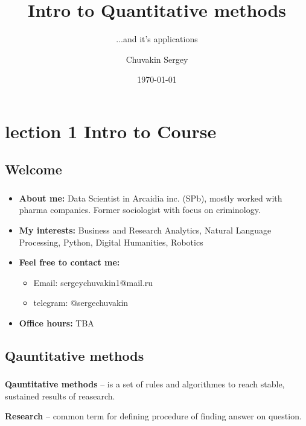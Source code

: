 \documentclass[t, 11pt]{beamer}
\title{Intro to Quantitative methods}
\subtitle{...and it's applications}
\author{Chuvakin Sergey}
\date{\today}
\institute[<<Anthropology>>]{<<School of Advanced Studies>>}
\begin{document}
	
	\frame[plain]{\titlepage}
	\section{lection 1 Intro to Course}
	
	
	\subsection{Welcome}
	\begin{frame} \label {welcome}
		\frametitle{\insertsection} 
		\frametitle{\insertsubsection} 
		\begin{itemize}
			\item \textbf{About me:} Data Scientist in Arcaidia inc. (SPb), mostly worked with pharma companies. Former sociologist with focus on criminology. 
			\item \textbf{My interests:} Business and Research Analytics, Natural Language Processing, Python, Digital Humanities, Robotics
			\item \textbf{Feel free to contact me:} \begin{itemize}
			    \item Email: sergeychuvakin1@mail.ru
			    \item telegram: @sergechuvakin
			\end{itemize}
			\item \textbf{Office hours:} TBA
		\end{itemize}
	\end{frame}

\subsection{Qauntitative methods}
\begin{frame}\label{}
	\frametitle{\insertsection}
	\frametitle{\insertsubsection}
	
\textbf{Qauntitative methods} -- is a set of rules and algorithmes to reach stable, sustained results of reasearch. 

\textbf{Research} -- common term for defining procedure of finding answer on question.

\end{frame}
\end{document}
